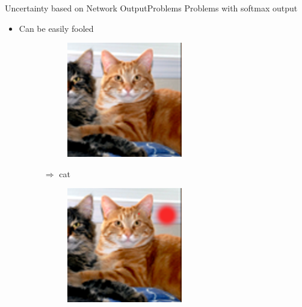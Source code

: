 \documentclass{beamer}
\begin{document}
\begin{frame}{Uncertainty based on Network Output}{Problems}
Problems with softmax output
\begin{itemize}
	\item Can be easily fooled
	\begin{figure}[H]
		\centering
		\begin{subfigure}{.1\textwidth}
			\includegraphics[width=\textwidth]{cat} 
		\end{subfigure} $\Rightarrow$ cat\hspace{1cm}
		\begin{subfigure}{.1\textwidth}
			\includegraphics[width=\textwidth]{cat_fooled}

\end{subfigure}
\end{figure}
\end{itemize}
\end{frame}
\end{document}
